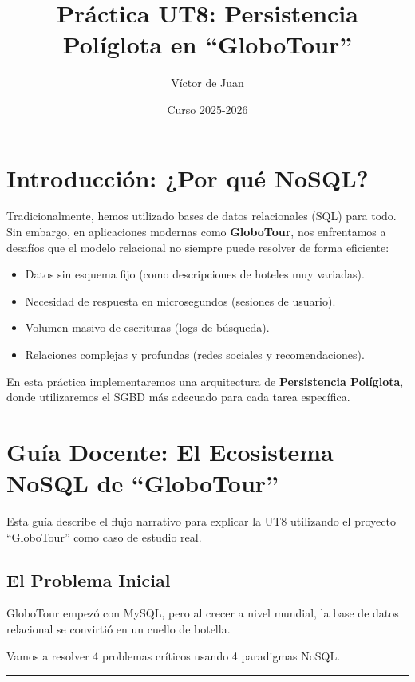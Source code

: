 \documentclass[12pt,a4paper]{article}
\title{\textbf{Práctica UT8: Persistencia Políglota en \enquote{GloboTour}}}
\author{Víctor de Juan}
\date{Curso 2025-2026}
\begin{document}
\maketitle

\section{Introducción: ¿Por qué NoSQL?}
Tradicionalmente, hemos utilizado bases de datos relacionales (SQL) para todo. Sin embargo, en aplicaciones modernas como \textbf{GloboTour}, nos enfrentamos a desafíos que el modelo relacional no siempre puede resolver de forma eficiente:
\begin{itemize}
    \item Datos sin esquema fijo (como descripciones de hoteles muy variadas).
    \item Necesidad de respuesta en microsegundos (sesiones de usuario).
    \item Volumen masivo de escrituras (logs de búsqueda).
    \item Relaciones complejas y profundas (redes sociales y recomendaciones).
\end{itemize}

En esta práctica implementaremos una arquitectura de \textbf{Persistencia Políglota}, donde utilizaremos el SGBD más adecuado para cada tarea específica.

\section{Guía Docente: El Ecosistema NoSQL de \enquote{GloboTour}}

Esta guía describe el flujo narrativo para explicar la UT8 utilizando el proyecto \enquote{GloboTour} como caso de estudio real.

\subsection{El Problema Inicial}

GloboTour empezó con MySQL, pero al crecer a nivel mundial, la base de datos relacional se convirtió en un cuello de botella. 

Vamos a resolver 4 problemas críticos usando 4 paradigmas NoSQL.

\begin{center}\rule{0.5\linewidth}{0.5pt}\end{center}
\end{document}

